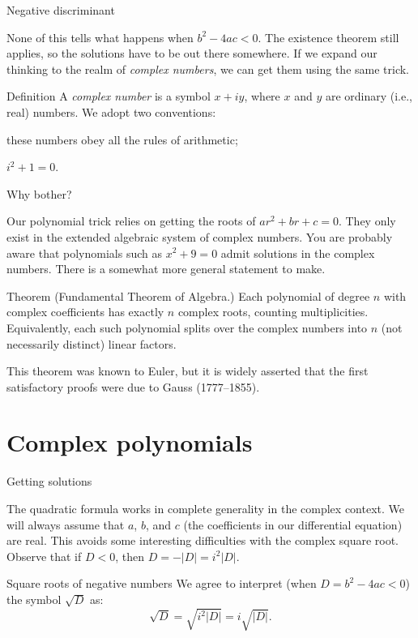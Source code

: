 \documentclass{beamer}
\begin{document}
\begin{frame}{Negative discriminant}

  None of this tells what happens when $b^2 - 4ac < 0$. The existence theorem still applies, so the solutions have to be out there somewhere. If we expand our thinking to the realm of \emph{complex numbers}, we can get them using the same trick.

  \begin{block}{Definition}
    A \emph{complex number} is a symbol $x + iy$, where $x$ and $y$ are ordinary (i.e., real) numbers. We adopt two conventions:
    \begin{inparaenum}[(1)]
      \item these numbers obey all the rules of arithmetic;
      \item $i^2 + 1 = 0$.
    \end{inparaenum}
  \end{block}

\end{frame}

\begin{frame}{Why bother?}

  Our polynomial trick relies on getting the roots of $ar^2 + br + c = 0$. They only exist in the extended algebraic system of complex numbers. You are probably aware that polynomials such as $x^2 + 9 = 0$ admit solutions in the complex numbers. There is a somewhat more general statement to make.

  \begin{block}{Theorem}
    (Fundamental Theorem of Algebra.) Each polynomial of degree $n$ with complex coefficients has exactly $n$ complex roots, counting multiplicities. Equivalently, each such polynomial splits over the complex numbers into $n$ (not necessarily distinct) linear factors.
  \end{block}

  This theorem was known to Euler, but it is widely asserted that the first satisfactory proofs were due to Gauss (1777--1855). 

\end{frame}

\section{Complex polynomials}

\begin{frame}{Getting solutions}
  
  The quadratic formula works in complete generality in the complex context. We will always assume that $a$, $b$, and $c$ (the coefficients in our differential equation) are real. This avoids some interesting difficulties with the complex square root. Observe that if $D < 0$, then $D = -|D| = i^2 |D|$.

  \begin{block}{Square roots of negative numbers}
  We agree to interpret (when $D = b^2 - 4ac < 0$) the symbol $\sqrt{D}$ as:
    \[
      \sqrt{D} = \sqrt{i^2 |D|} = i \sqrt{|D|}.
    \]
  \end{block}

\end{frame}
\end{document}

